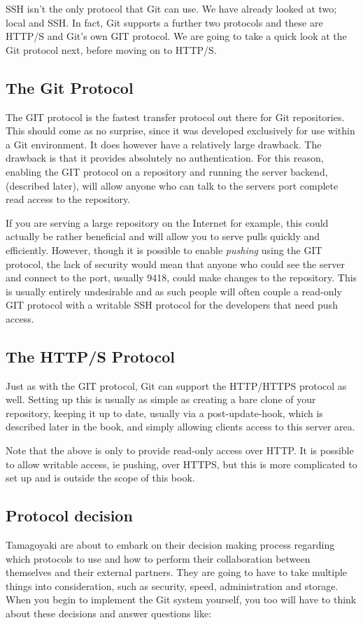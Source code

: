 SSH isn't the only protocol that Git can use.  We have already looked at two; local and SSH.  In fact, Git supports a further two protocols and these are HTTP/S and Git's own GIT protocol.  We are going to take a quick look at the Git protocol next, before moving on to HTTP/S.

\subsection{The Git Protocol}
The GIT protocol is the fastest transfer protocol out there for Git repositories.  This should come as no surprise, since it was developed exclusively for use within a Git environment.  It does however have a relatively large drawback.  The drawback is that it provides absolutely no authentication.  For this reason, enabling the GIT protocol on a repository and running the server backend, (described later), will allow anyone who can talk to the servers port complete read access to the repository.

If you are serving a large repository on the Internet for example, this could actually be rather beneficial and will allow you to serve pulls quickly and efficiently.  However, though it is possible to enable \emph{pushing} using the GIT protocol, the lack of security would mean that anyone who could see the server and connect to the port, usually 9418, could make changes to the repository.  This is usually entirely undesirable and as such people will often couple a read-only GIT protocol with a writable SSH protocol for the developers that need push access.

\subsection{The HTTP/S Protocol}
Just as with the GIT protocol, Git can support the HTTP/HTTPS protocol as well.  Setting up this is usually as simple as creating a bare clone of your repository, keeping it up to date, usually via a post-update-hook, which is described later in the book, and simply allowing clients access to this server area.  

Note that the above is only to provide read-only access over HTTP.  It is possible to allow writable access, ie pushing, over HTTPS, but this is more complicated to set up and is outside the scope of this book.

\subsection{Protocol decision}
Tamagoyaki are about to embark on their decision making process regarding which protocols to use and how to perform their collaboration between themselves and their external partners.  They are going to have to take multiple things into consideration, such as security, speed, administration and storage.  When you begin to implement the Git system yourself, you too will have to think about these decisions and answer questions like:

